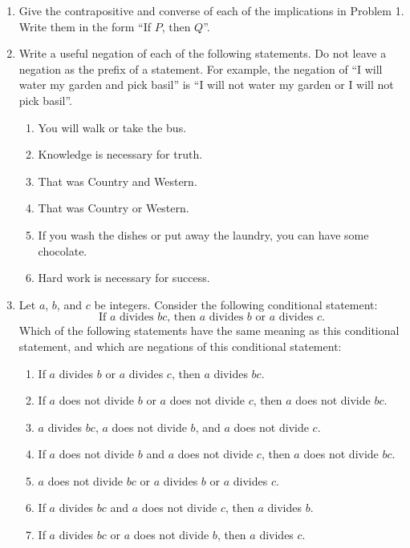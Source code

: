 \documentclass[12pt]{article}
\begin{document}
\begin{enumerate}
%
\item Give the contrapositive and converse of each of the implications in Problem 1.
     Write them in the form ``If $P$, then $Q$''.

\newpage
\item Write a useful negation of each of the following statements.
  Do not leave a negation as the prefix of a statement.
  For example, the negation of ``I will water my garden and pick basil'' is
  ``I will not water my garden or I will not pick basil''.
  \begin{enumerate}
  \item   You will walk or take the bus.
  \item   Knowledge is necessary for truth.
  \item   That was Country and Western.
  \item   That was Country or Western.
  \item   If you wash the dishes or put away the laundry, you can have some chocolate.
  \item   Hard work is necessary for success.
  \end{enumerate}
 
\item  Let $a$, $b$, and $c$ be integers.
  Consider the following conditional statement:
  \[\mbox{If $a$ divides $bc$, then $a$ divides $b$ or $a$ divides $c$.}\]
  Which of the following statements have the same meaning as this conditional statement, and which are negations of this
  conditional statement:
  \begin{enumerate}
   \item If $a$ divides $b$ or $a$ divides $c$, then $a$ divides $bc$.
   \item If $a$ does not divide $b$ or $a$ does not divide $c$, then $a$ does not divide $bc$.
   \item $a$ divides $bc$, $a$ does not divide $b$, and $a$ does not divide $c$.
   \item If $a$ does not divide $b$ and $a$ does not divide $c$, then $a$ does not divide $bc$.
   \item $a$ does not divide $bc$ or $a$  divides $b$ or $a$  divides $c$.
   \item If $a$ divides $bc$ and $a$ does not divide $c$, then $a$ divides $b$.
   \item If $a$ divides $bc$ or $a$ does not divide $b$, then $a$ divides $c$.
  \end{enumerate}


\end{enumerate}
\end{document}
